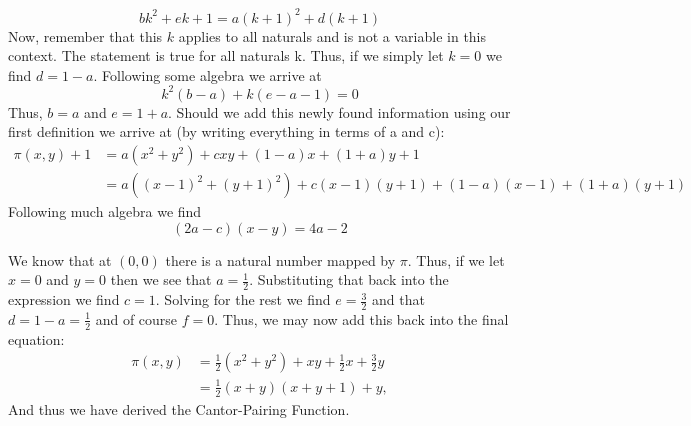 \documentclass{article}
\begin{document}
\[
bk^{2}+ek+1=a(k+1)^{2}+d(k+1)
\]
Now, remember that this $k$ applies to all naturals and is not a variable in this context. The statement is true for all naturals k. Thus, if we simply let $k=0$ we find $d=1-a$. Following some algebra we arrive at
\[
k^2(b-a)+k(e-a-1)=0
\] 
Thus, $b=a$ and $e=1+a$. Should we add this newly found information using our first definition we arrive at (by writing everything in terms of a and c):
\[
{\begin{aligned}\pi (x,y)+1&=a(x^{2}+y^{2})+cxy+(1-a)x+(1+a)y+1\\&=a((x-1)^{2}+(y+1)^{2})+c(x-1)(y+1)+(1-a)(x-1)+(1+a)(y+1)\end{aligned}}
\]
Following much algebra we find
\[
(2a-c)(x-y)=4a-2
\]
\par We know that at $(0,0)$ there is a natural number mapped by $\pi$. Thus, if we let $x=0$ and $y=0$ then we see that $a=\frac{1}{2}$. Substituting that back into the expression we find $c=1$. Solving for the rest we find $e=\frac{3}{2}$ and that $d=1-a=\frac{1}{2}$ and of course $f=0$. Thus, we may now add this back into the final equation:
\[
{\begin{aligned}\pi (x,y)&={\frac {1}{2}}(x^{2}+y^{2})+xy+{\frac {1}{2}}x+{\frac {3}{2}}y\\&={\frac {1}{2}}(x+y)(x+y+1)+y,\end{aligned}}
\]
And thus we have derived the Cantor-Pairing Function.
\end{document}
